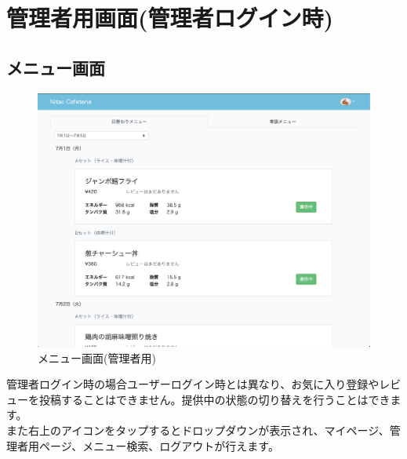 \documentclass[a4paper]{jsarticle}
\begin{document}
\section{管理者用画面(管理者ログイン時)}
\subsection{メニュー画面}
\begin{figure}[htbp]
	\centering
	\includegraphics[scale = 0.225]{image/menu_admin.png}
	\caption{メニュー画面(管理者用)}
	\end{figure}
	管理者ログイン時の場合ユーザーログイン時とは異なり、お気に入り登録やレビューを投稿することはできません。提供中の状態の切り替えを行うことはできます。\\
	また右上のアイコンをタップするとドロップダウンが表示され、マイページ、管理者用ページ、メニュー検索、ログアウトが行えます。
	\newpage
\end{document}
